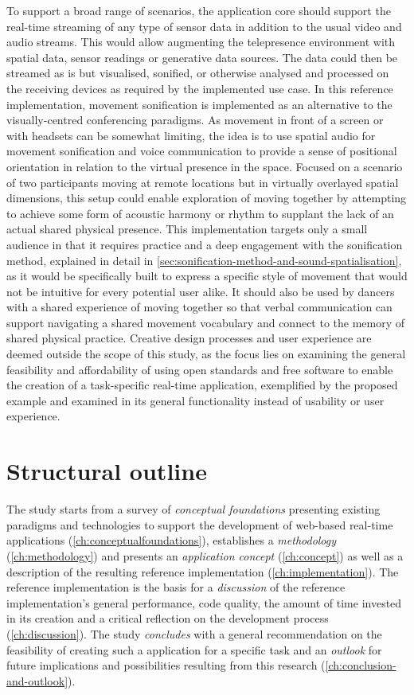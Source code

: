 To support a broad range of scenarios, the application core should support the real-time streaming of any type of sensor data in addition to the usual video and audio streams.
This would allow augmenting the telepresence environment with spatial data, sensor readings or generative data sources.
The data could then be streamed as is but visualised, sonified, or otherwise analysed and processed on the receiving devices as required by the implemented use case.
In this reference implementation, movement sonification is implemented as an alternative to the visually-centred conferencing paradigms.
As movement in front of a screen or with headsets can be somewhat limiting, the idea is to use spatial audio for movement sonification and voice communication to provide a sense of positional orientation in relation to the virtual presence in the space.
Focused on a scenario of two participants moving at remote locations but in virtually overlayed spatial dimensions, this setup could enable exploration of moving together by attempting to achieve some form of acoustic harmony or rhythm to supplant the lack of an actual shared physical presence.
This implementation targets only a small audience in that it requires practice and a deep engagement with the sonification method, explained in detail in \autoref{sec:sonification-method-and-sound-spatialisation}, as it would be specifically built to express a specific style of movement that would not be intuitive for every potential user alike.
It should also be used by dancers with a shared experience of moving together so that verbal communication can support navigating a shared movement vocabulary and connect to the memory of shared physical practice.
Creative design processes and user experience are deemed outside the scope of this study, as the focus lies on examining the general feasibility and affordability of using open standards and free software to enable the creation of a task-specific real-time application, exemplified by the proposed example and examined in its general functionality instead of usability or user experience.

\section{Structural outline}
\label{sec:outline}

The study starts from a survey of \emph{conceptual foundations} presenting existing paradigms and technologies to support the development of web-based real-time applications (\autoref{ch:conceptualfoundations}), establishes a \emph{methodology} (\autoref{ch:methodology}) and presents an \emph{application concept} (\autoref{ch:concept}) as well as a description of the resulting {reference implementation} (\autoref{ch:implementation}).
The reference implementation is the basis for a \emph{discussion} of the reference implementation's general performance, code quality, the amount of time invested in its creation and a critical reflection on the development process (\autoref{ch:discussion}).
The study \emph{concludes} with a general recommendation on the feasibility of creating such a  application for a specific task and an \emph{outlook} for future implications and possibilities resulting from this research (\autoref{ch:conclusion-and-outlook}).
